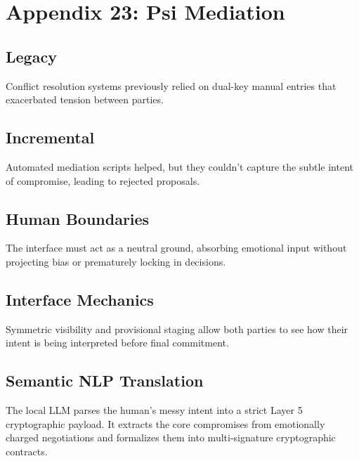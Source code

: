 \chapter{Appendix 23: Psi Mediation}

\section{Legacy}
Conflict resolution systems previously relied on dual-key manual entries that exacerbated tension between parties.

\section{Incremental}
Automated mediation scripts helped, but they couldn't capture the subtle intent of compromise, leading to rejected proposals.

\section{Human Boundaries}
The interface must act as a neutral ground, absorbing emotional input without projecting bias or prematurely locking in decisions.

\section{Interface Mechanics}
Symmetric visibility and provisional staging allow both parties to see how their intent is being interpreted before final commitment.

\section{Semantic NLP Translation}
The local LLM parses the human's messy intent into a strict Layer 5 cryptographic payload. It extracts the core compromises from emotionally charged negotiations and formalizes them into multi-signature cryptographic contracts.

